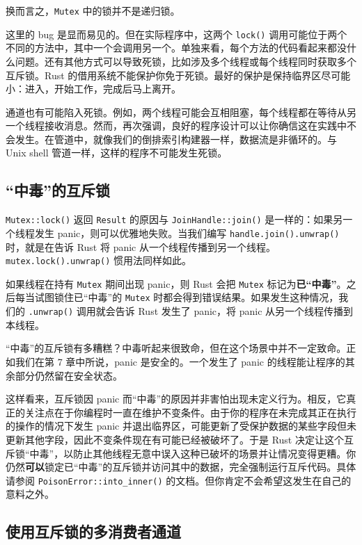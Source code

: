 换而言之，\texttt{Mutex} 中的锁并不是递归锁。

这里的 bug 是显而易见的。但在实际程序中，这两个 \texttt{lock()} 调用可能位于两个不同的方法中，其中一个会调用另一个。单独来看，每个方法的代码看起来都没什么问题。还有其他方式可以导致死锁，比如涉及多个线程或每个线程同时获取多个互斥锁。Rust 的借用系统不能保护你免于死锁。最好的保护是保持临界区尽可能小：进入，开始工作，完成后马上离开。

通道也有可能陷入死锁。例如，两个线程可能会互相阻塞，每个线程都在等待从另一个线程接收消息。然而，再次强调，良好的程序设计可以让你确信这在实践中不会发生。在管道中，就像我们的倒排索引构建器一样，数据流是非循环的。与 Unix shell 管道一样，这样的程序不可能发生死锁。

\subsection{“中毒”的互斥锁}

\texttt{Mutex::lock()} 返回 \texttt{Result} 的原因与 \texttt{JoinHandle::join()} 是一样的：如果另一个线程发生 panic，则可以优雅地失败。当我们编写 \texttt{handle.join().unwrap()} 时，就是在告诉 Rust 将 panic 从一个线程传播到另一个线程。\texttt{mutex.lock().unwrap()} 惯用法同样如此。

如果线程在持有 \texttt{Mutex} 期间出现 panic，则 Rust 会把 \texttt{Mutex} 标记为\textbf{已“中毒”}。之后每当试图锁住已“中毒”的 \texttt{Mutex} 时都会得到错误结果。如果发生这种情况，我们的 \texttt{.unwrap()} 调用就会告诉 Rust 发生了 panic，将 panic 从另一个线程传播到本线程。

“中毒”的互斥锁有多糟糕？中毒听起来很致命，但在这个场景中并不一定致命。正如我们在第 7 章中所说，panic 是安全的。一个发生了 panic 的线程能让程序的其余部分仍然留在安全状态。

这样看来，互斥锁因 panic 而“中毒”的原因并非害怕出现未定义行为。相反，它真正的关注点在于你编程时一直在维护不变条件。由于你的程序在未完成其正在执行的操作的情况下发生 panic 并退出临界区，可能更新了受保护数据的某些字段但未更新其他字段，因此不变条件现在有可能已经被破坏了。于是 Rust 决定让这个互斥锁“中毒”，以防止其他线程无意中误入这种已破坏的场景并让情况变得更糟。你仍然\textbf{可以}锁定已“中毒”的互斥锁并访问其中的数据，完全强制运行互斥代码。具体请参阅 \texttt{PoisonError::into\_inner()} 的文档。但你肯定不会希望这发生在自己的意料之外。

\subsection{使用互斥锁的多消费者通道}

